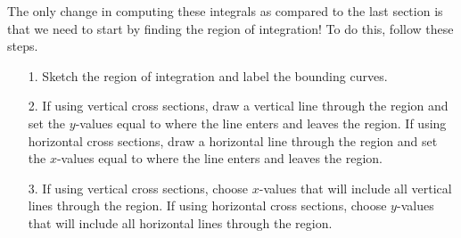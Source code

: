 \documentclass[12pt, letter]{article}
\theoremstyle{plain}
\numberwithin{theorem}{section}
\theoremstyle{definition}
\begin{document}
\bigskip

\hrulefill

\bigskip

The only change in computing these integrals as compared to the last section is that we need to start by finding the region of integration! To do this, follow these steps.

\begin{itemize}
\item[1.] Sketch the region of integration and label the bounding curves.
\item[2.] If using vertical cross sections, draw a vertical line through the region and set the $y$-values equal to where the line enters and leaves the region. If using horizontal cross sections, draw a horizontal line through the region and set the $x$-values equal to where the line enters and leaves the region.
\item[3.] If using vertical cross sections, choose $x$-values that will include all vertical lines through the region. If using horizontal cross sections, choose $y$-values that will include all horizontal lines through the region.
\end{itemize}

\bigskip

\hrulefill

\bigskip
\end{document}
